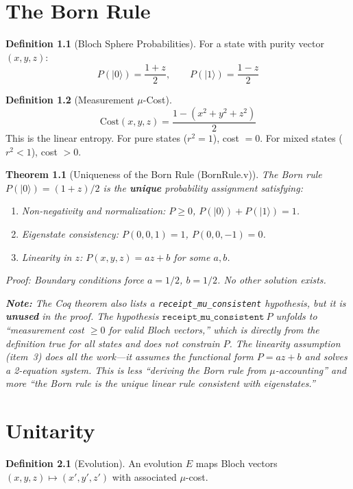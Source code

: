 \documentclass[11pt, a4paper]{report}
\theoremstyle{definition}
\newtheorem{definition}{Definition}[chapter]
\theoremstyle{plain}
\newtheorem{theorem}{Theorem}[chapter]
\begin{document}
\chapter{The Born Rule}

\begin{definition}[Bloch Sphere Probabilities]
For a state with purity vector $(x,y,z)$:
\[ P(|0\rangle) = \frac{1+z}{2}, \qquad P(|1\rangle) = \frac{1-z}{2} \]
\end{definition}

\begin{definition}[Measurement $\mu$-Cost]
\[ \mathrm{Cost}(x,y,z) = \frac{1 - (x^2 + y^2 + z^2)}{2} \]
This is the linear entropy. For pure states ($r^2=1$), cost $= 0$. For mixed states ($r^2 < 1$), cost $> 0$.
\end{definition}

\begin{theorem}[Uniqueness of the Born Rule {\normalfont (BornRule.v)}]
The Born rule $P(|0\rangle) = (1+z)/2$ is the \textbf{unique} probability assignment satisfying:
\begin{enumerate}
    \item Non-negativity and normalization: $P \ge 0$, $P(|0\rangle) + P(|1\rangle) = 1$.
    \item Eigenstate consistency: $P(0,0,1) = 1$, $P(0,0,-1) = 0$.
    \item Linearity in $z$: $P(x,y,z) = az + b$ for some $a,b$.
\end{enumerate}
Proof: Boundary conditions force $a = 1/2$, $b = 1/2$. No other solution exists.

\textbf{Note:} The Coq theorem also lists a \texttt{receipt\_mu\_consistent} hypothesis, but it is \textbf{unused} in the proof. The hypothesis $\texttt{receipt\_mu\_consistent}~P$ unfolds to ``measurement cost $\ge 0$ for valid Bloch vectors,'' which is directly from the definition true for all states and does not constrain $P$. The linearity assumption (item~3) does all the work---it assumes the functional form $P = az+b$ and solves a 2-equation system. This is less ``deriving the Born rule from $\mu$-accounting'' and more ``the Born rule is the unique linear rule consistent with eigenstates.''
\end{theorem}

\chapter{Unitarity}

\begin{definition}[Evolution]
An evolution $E$ maps Bloch vectors $(x,y,z) \mapsto (x',y',z')$ with associated $\mu$-cost.
\end{definition}
\end{document}
